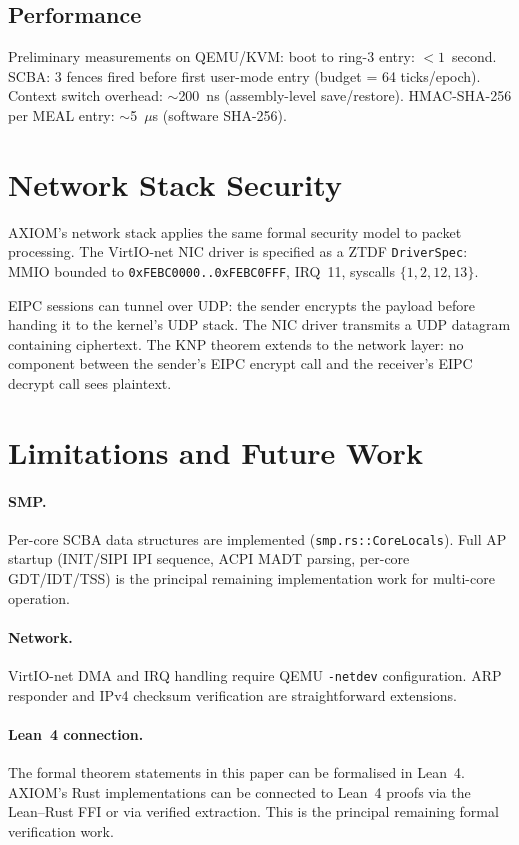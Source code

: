 \documentclass[10pt,twocolumn]{article}
\begin{document}
\subsection{Performance}

Preliminary measurements on QEMU/KVM:
boot to ring-3 entry: $<1$~second.
SCBA: 3 fences fired before first user-mode entry (budget = 64 ticks/epoch).
Context switch overhead: $\sim$200~ns (assembly-level save/restore).
HMAC-SHA-256 per MEAL entry: $\sim$5~$\mu$s (software SHA-256).

\section{Network Stack Security}

AXIOM's network stack applies the same formal security model to packet
processing. The VirtIO-net NIC driver is specified as a ZTDF
\texttt{DriverSpec}: MMIO bounded to \texttt{0xFEBC0000..0xFEBC0FFF},
IRQ~11, syscalls $\{1, 2, 12, 13\}$.

EIPC sessions can tunnel over UDP: the sender encrypts the payload before
handing it to the kernel's UDP stack. The NIC driver transmits a UDP
datagram containing ciphertext. The KNP theorem extends to the network
layer: no component between the sender's EIPC encrypt call and the
receiver's EIPC decrypt call sees plaintext.

\section{Limitations and Future Work}

\paragraph{SMP.} Per-core SCBA data structures are implemented
(\texttt{smp.rs::CoreLocals}). Full AP startup (INIT/SIPI IPI sequence,
ACPI MADT parsing, per-core GDT/IDT/TSS) is the principal remaining
implementation work for multi-core operation.

\paragraph{Network.} VirtIO-net DMA and IRQ handling require QEMU
\texttt{-netdev} configuration. ARP responder and IPv4 checksum
verification are straightforward extensions.

\paragraph{Lean~4 connection.} The formal theorem statements in this
paper can be formalised in Lean~4. AXIOM's Rust implementations can be
connected to Lean~4 proofs via the Lean--Rust FFI or via verified
extraction. This is the principal remaining formal verification work.
\end{document}
